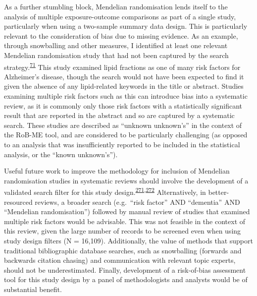 \documentclass[a4paper, twoside]{templates/ociamthesis}
\begin{document}
As a further stumbling block, Mendelian randomisation lends itself to the analysis of multiple exposure-outcome comparisons as part of a single study, particularly when using a two-sample summary data design. This is particularly relevant to the consideration of bias due to missing evidence. As an example, through snowballing and other measures, I identified at least one relevant Mendelian randomisation study that had not been captured by the search strategy.\textsuperscript{\protect\hyperlink{ref-larsson2017}{71}} This study examined lipid fractions as one of many risk factors for Alzheimer's disease, though the search would not have been expected to find it given the absence of any lipid-related keywords in the title or abstract. Studies examining multiple risk factors such as this can introduce bias into a systematic review, as it is commonly only those risk factors with a statistically significant result that are reported in the abstract and so are captured by a systematic search. These studies are described as ``unknown unknown's'' in the context of the RoB-ME tool, and are considered to be particularly challenging (as opposed to an analysis that was insufficiently reported to be included in the statistical analysis, or the ``known unknown's'').

Useful future work to improve the methodology for inclusion of Mendelian randomisation studies in systematic reviews should involve the development of a validated search filter for this study design.\textsuperscript{\protect\hyperlink{ref-waffenschmidt2020}{271},\protect\hyperlink{ref-wagner2020}{272}} Alternatively, in better-resourced reviews, a broader search (e.g.~``risk factor'' AND ``dementia'' AND ``Mendelian randomisation'') followed by manual review of studies that examined multiple risk factors would be advisable. This was not feasible in the context of this review, given the large number of records to be screened even when using study design filters (N = 16,109). Additionally, the value of methods that support traditional bibliographic database searches, such as snowballing (forwards and backwards citation chasing) and communication with relevant topic experts, should not be underestimated. Finally, development of a risk-of-bias assessment tool for this study design by a panel of methodologists and analysts would be of substantial benefit.
\end{document}
